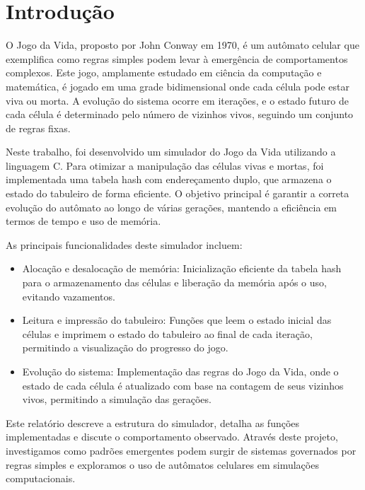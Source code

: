 \documentclass{article}
\begin{document}

\section{Introdução}

\par O Jogo da Vida, proposto por John Conway em 1970, é um autômato celular que exemplifica como regras simples podem levar à emergência de comportamentos complexos. Este jogo, amplamente estudado em ciência da computação e matemática, é jogado em uma grade bidimensional onde cada célula pode estar viva ou morta. A evolução do sistema ocorre em iterações, e o estado futuro de cada célula é determinado pelo número de vizinhos vivos, seguindo um conjunto de regras fixas.

\par Neste trabalho, foi desenvolvido um simulador do Jogo da Vida utilizando a linguagem C. Para otimizar a manipulação das células vivas e mortas, foi implementada uma tabela hash com endereçamento duplo, que armazena o estado do tabuleiro de forma eficiente. O objetivo principal é garantir a correta evolução do autômato ao longo de várias gerações, mantendo a eficiência em termos de tempo e uso de memória.

As principais funcionalidades deste simulador incluem:

\begin{itemize}
\item Alocação e desalocação de memória: Inicialização eficiente da tabela hash para o armazenamento das células e liberação da memória após o uso, evitando vazamentos.
\item Leitura e impressão do tabuleiro: Funções que leem o estado inicial das células e imprimem o estado do tabuleiro ao final de cada iteração, permitindo a visualização do progresso do jogo.
\item Evolução do sistema: Implementação das regras do Jogo da Vida, onde o estado de cada célula é atualizado com base na contagem de seus vizinhos vivos, permitindo a simulação das gerações. 
\end{itemize}

\par Este relatório descreve a estrutura do simulador, detalha as funções implementadas e discute o comportamento observado. Através deste projeto, investigamos como padrões emergentes podem surgir de sistemas governados por regras simples e exploramos o uso de autômatos celulares em simulações computacionais.
\end{document}
